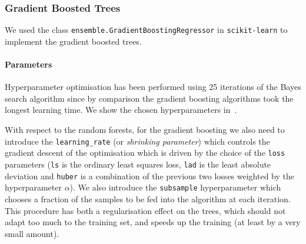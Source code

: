 \subsubsection{Gradient Boosted Trees}

We used the class \texttt{ensemble.GradientBoostingRegressor} in \texttt{scikit-learn} to implement the gradient boosted trees.


\paragraph{Parameters}

Hyperparameter optimisation has been performed using 25 iterations of the Bayes search algorithm since by comparison the gradient boosting algorithms took the longest learning time.
We show the chosen hyperparameters in~.

With respect to the random forests, for the gradient boosting we also need to introduce the \texttt{learning\_rate} (or \emph{shrinking parameter}) which controls the gradient descent of the optimisation which is driven by the choice of the \texttt{loss} parameters (\texttt{ls} is the ordinary least squares loss, \texttt{lad} is the least absolute deviation and \texttt{huber} is a combination of the previous two losses weighted by the hyperparameter $\alpha$).
We also introduce the \texttt{subsample} hyperparameter which chooses a fraction of the samples to be fed into the algorithm at each iteration.
This procedure has both a regularisation effect on the trees, which should not adapt too much to the training set, and speeds up the training (at least by a very small amount).

